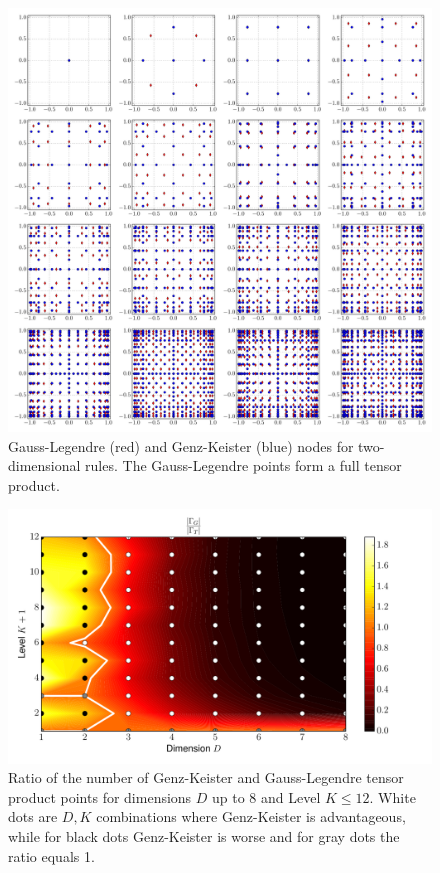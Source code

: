 \documentclass[a4paper,10pt]{article}
\begin{document}
\begin{figure}[h]
  \centering
  \includegraphics[width=\linewidth]{./img/gk_legendre_nodes_2d.pdf}
  \caption{Gauss-Legendre (red) and Genz-Keister (blue) nodes for
  two-dimensional rules. The Gauss-Legendre points form a full tensor
  product.}
  \label{fig:gk_legendre_nodes_2d}
\end{figure}

\begin{figure}[h]
  \centering
  \includegraphics[width=0.8\linewidth]{./img/gk_legendre_ratio.pdf}
  \caption{Ratio of the number of Genz-Keister and Gauss-Legendre tensor product
  points for dimensions $D$ up to 8 and Level $K \leq 12$. White dots are $D,K$
  combinations where Genz-Keister is advantageous, while for black dots
  Genz-Keister is worse and for gray dots the ratio equals 1.}
  \label{fig:gk_legendre_ratio}
\end{figure}
\end{document}
